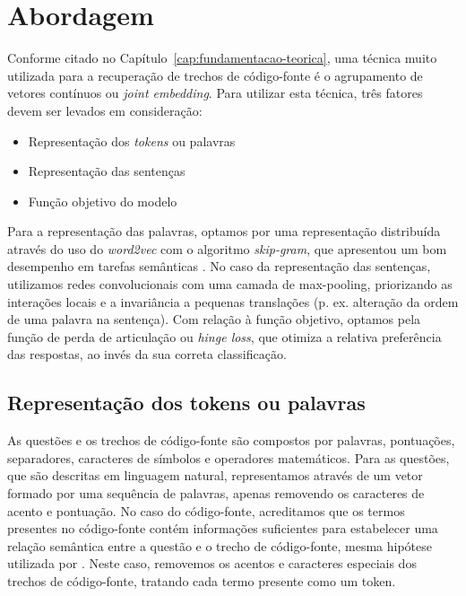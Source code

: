 \chapter{Abordagem}
\label{cap:abordagem}

Conforme citado no Capítulo~\ref{cap:fundamentacao-teorica}, uma técnica muito utilizada para a recuperação de trechos de código-fonte é o agrupamento de vetores contínuos ou \textit{joint embedding}. Para utilizar esta técnica, três fatores devem ser levados em consideração:

\begin{itemize}
    \item Representação dos \textit{tokens} ou palavras
    \item Representação das sentenças
    \item Função objetivo do modelo
\end{itemize}

Para a representação das palavras, optamos por uma representação distribuída através do uso do \textit{word2vec} com o algoritmo \textit{skip-gram}, que apresentou um bom desempenho em tarefas semânticas \citep{mikolov2013distributed}. No caso da representação das sentenças, utilizamos redes convolucionais com uma camada de \gls{max-pooling}, priorizando as interações locais e a invariância a pequenas translações (p. ex. alteração da ordem de uma palavra na sentença). Com relação à função objetivo, optamos pela função de perda de articulação ou \textit{hinge loss}, que otimiza a relativa preferência das respostas, ao invés da sua correta classificação.



\section{Representação dos tokens ou palavras}
\label{sec:abordagem-representacao-token}

As questões e os trechos de código-fonte são compostos por palavras, pontuações, separadores, caracteres de símbolos e operadores matemáticos. Para as questões, que são descritas em linguagem natural, representamos através de um vetor formado por uma sequência de palavras, apenas removendo os caracteres de acento e pontuação. No caso do código-fonte, acreditamos que os termos presentes no código-fonte contém informações suficientes para estabelecer uma relação semântica entre a questão e o trecho de código-fonte, mesma hipótese utilizada por \cite{Sachdev-neural-code-search:2018}. Neste caso, removemos os acentos e caracteres especiais dos trechos de código-fonte, tratando cada termo presente como um \gls{token}.

